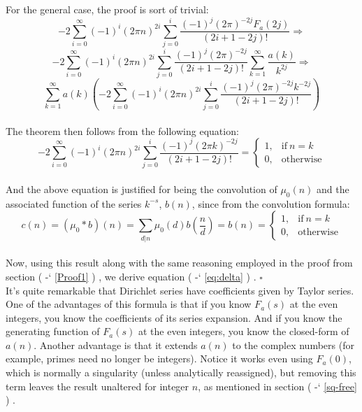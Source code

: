 \documentclass[12pt]{article}
\newcommand*{\eqrefe}[1]{%
\begingroup
(\color{BrickRed}
\romannumeral-`\x %
\setcitestyle{numbers}%
\ref{eq:#1}%
\endgroup
)\ignorespacesafterend
}
\newcommand*{\secrefe}[1]{%
\begingroup
(\color{Aquamarine}
\romannumeral-`\x %
\setcitestyle{numbers}%
\ref{#1}%
\endgroup
)\ignorespacesafterend
}
\begin{document}
\indent For the general case, the proof is sort of trivial: 
\begin{equation} \nonumber
-2\sum_{i=0}^{\infty} (-1)^{i}(2\pi n)^{2i}\sum_{j=0}^{i}\frac{(-1)^j (2\pi)^{-2j}F_a(2j)}{(2i+1-2j)!} \Rightarrow
\end{equation}
\begin{equation} \nonumber
-2\sum_{i=0}^{\infty} (-1)^{i}(2\pi n)^{2i}\sum_{j=0}^{i}\frac{(-1)^j (2\pi)^{-2j}}{(2i+1-2j)!}\sum_{k=1}^{\infty}\frac{a(k)}{k^{2j}} \Rightarrow
\end{equation}
\begin{equation} \nonumber
\sum_{k=1}^{\infty}a(k)\left(-2\sum_{i=0}^{\infty} (-1)^{i}(2\pi n)^{2i}\sum_{j=0}^{i}\frac{(-1)^j (2\pi)^{-2j}k^{-2j}}{(2i+1-2j)!}\right)
\end{equation}\\
\indent The theorem then follows from the following equation:
\begin{equation} \label{eq:delta}
-2\sum_{i=0}^{\infty} (-1)^{i}(2\pi n)^{2i}\sum_{j=0}^{i}\frac{(-1)^j (2\pi k)^{-2j}}{(2i+1-2j)!}=\begin{cases}
      1, & \text{if}\ n=k\\
      0, & \text{otherwise}
\end{cases} 
\end{equation}\\
\indent And the above equation is justified for being the convolution of $\mu_0(n)$ and the associated function of the series $k^{-s}$, $b(n)$, since from the convolution formula:
\begin{equation} \nonumber
c(n)=(\mu_0*b)(n)=\sum_{d|n}\mu_0(d) b\left(\frac{n}{d}\right)=b(n)=\begin{cases}
      1, & \text{if}\ n=k\\
      0, & \text{otherwise}
\end{cases} 
\end{equation}\\
\indent Now, using this result along with the same reasoning employed in the proof from section \secrefe{Proof1}, we derive equation \eqrefe{delta}. $\square$\\

\indent It's quite remarkable that Dirichlet series have coefficients given by Taylor series. One of the advantages of this formula is that if you know $F_a(s)$ at the even integers, you know the coefficients of its series expansion. And if you know the generating function of $F_a(s)$ at the even integers, you know the closed-form of $a(n)$. Another advantage is that it extends $a(n)$ to the complex numbers (for example, primes need no longer be integers). Notice it works even using $F_a(0)$, which is normally a singularity (unless analytically reassigned), but removing this term leaves the result unaltered for integer $n$, as mentioned in section \secrefe{sq-free}.\\
\end{document}
